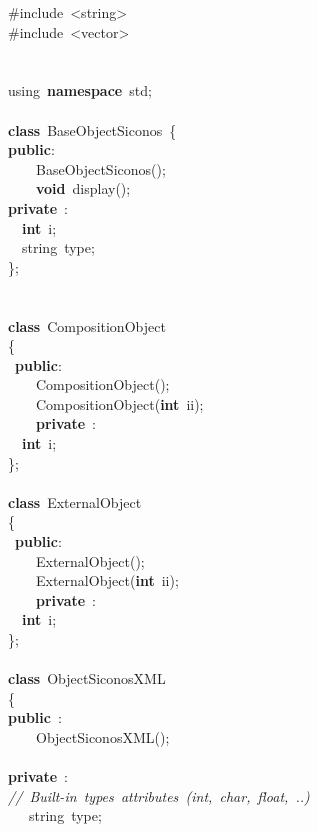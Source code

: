 {\ttfamily \raggedright \small
\#include\ <{}string>{}\\
\#include\ <{}vector>{}\\
\ \\
\ \\
using\ \textbf{namespace}\ std;\\
\ \\
\textbf{class}\ BaseObjectSiconos\ \{\\
\textbf{public}:\\
\ \ \ \ BaseObjectSiconos();\\
\ \ \ \ \textbf{void}\ display();\\
\textbf{private}\ :\\
\ \ \textbf{int}\ i;\\
\ \ string\ type;\ \\
\};\\
\ \\
\ \\
\textbf{class}\ CompositionObject\\
\{\\
\ \textbf{public}:\\
\ \ \ \ CompositionObject();\\
\ \ \ \ CompositionObject(\textbf{int}\ ii);\\
\ \ \ \ \textbf{private}\ :\\
\ \ \textbf{int}\ i;\\
\};\\
\ \\
\textbf{class}\ ExternalObject\\
\{\\
\ \textbf{public}:\\
\ \ \ \ ExternalObject();\\
\ \ \ \ ExternalObject(\textbf{int}\ ii);\\
\ \ \ \ \textbf{private}\ :\\
\ \ \textbf{int}\ i;\\
\};\\
\ \\
\textbf{class}\ ObjectSiconosXML\ \\
\{\\
\textbf{public}\ :\\
\ \ \ \ ObjectSiconosXML();\\
\ \\
\textbf{private}\ :\\
\textsl{//\ Built-{}in\ types\ attributes\ (int,\ char,\ float,\ ..)}\\
\ \ \ string\ type;\ \\
}
